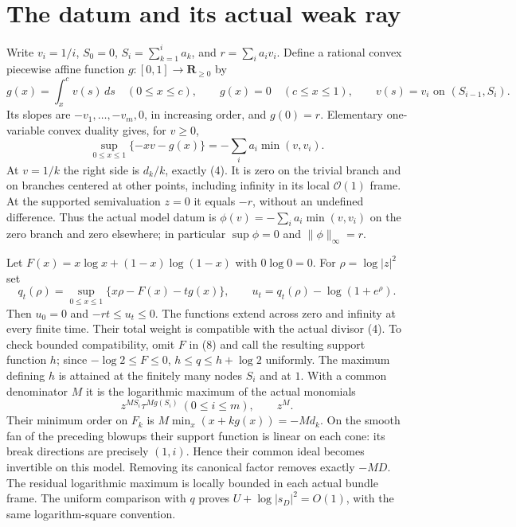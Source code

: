 \documentclass[11pt]{article}
\begin{document}
\section{The datum and its actual weak ray}
Write $v_i=1/i$, $S_0=0$, $S_i=\sum_{k=1}^i a_k$, and
$r=\sum_i a_iv_i$. Define a rational convex piecewise affine function
$g:[0,1]\to\mathbf R_{\geq0}$ by
\[
 g(x)=\int_x^c v(s)\,ds\quad(0\leq x\leq c),\qquad
 g(x)=0\quad(c\leq x\leq1),\qquad
 v(s)=v_i\text{ on }(S_{i-1},S_i).                       \tag{6}
\]
Its slopes are $-v_1,\ldots,-v_m,0$, in increasing order,
and $g(0)=r$. Elementary one-variable convex duality gives, for $v\geq0$,
\[
 \sup_{0\leq x\leq1}\{-xv-g(x)\}
             =-\sum_i a_i\min(v,v_i).                   \tag{7}
\]
At $v=1/k$ the right side is $d_k/k$, exactly (4). It is zero
on the trivial branch and on branches centered at other points,
including infinity in its local $\mathcal O(1)$ frame. At the supported
semivaluation $z=0$ it equals $-r$, without an undefined difference.
Thus the actual model datum is
$\phi(v)=-\sum_i a_i\min(v,v_i)$ on the zero branch and zero elsewhere;
in particular $\sup\phi=0$ and $\|\phi\|_\infty=r$.

Let $F(x)=x\log x+(1-x)\log(1-x)$ with $0\log0=0$.
For $\rho=\log|z|^2$ set
\[
 q_t(\rho)=\sup_{0\leq x\leq1}\{x\rho-F(x)-tg(x)\},
 \qquad u_t=q_t(\rho)-\log(1+e^\rho).                  \tag{8}
\]
Then $u_0=0$ and $-rt\leq u_t\leq0$. The functions extend across zero
and infinity at every finite time. Their total weight is compatible
with the actual divisor (4). To check bounded compatibility, omit $F$
in (8) and call the resulting support function $h$; since
$-\log2\leq F\leq0$, $h\leq q\leq h+\log2$ uniformly.
The maximum defining $h$ is attained at the finitely many nodes $S_i$
and at $1$. With a common denominator $M$ it is the logarithmic maximum
of the actual monomials
\[
 z^{MS_i}\tau^{Mg(S_i)}\ (0\leq i\leq m),\qquad z^M.     \tag{9}
\]
Their minimum order on $F_k$ is
$M\min_x(x+kg(x))=-Md_k$. On the smooth fan of the preceding blowups
their support function is linear on each cone: its break directions
are precisely $(1,i)$. Hence their common ideal becomes invertible
on this model. Removing its canonical factor removes exactly $-MD$.
The residual logarithmic maximum is locally bounded in each actual
bundle frame. The uniform comparison with $q$ proves
$U+\log|s_D|^2=O(1)$, with the same logarithm-square convention.
\end{document}
